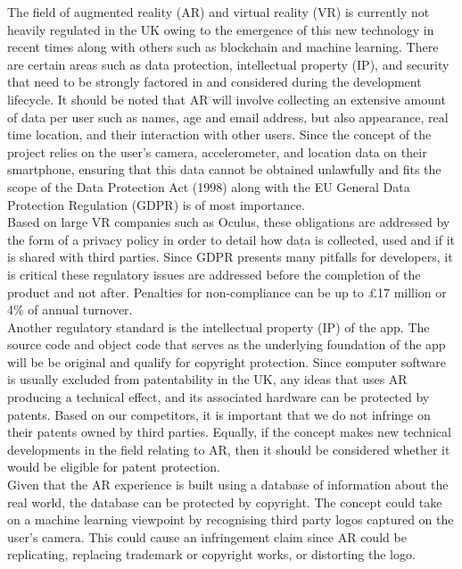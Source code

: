 The field of augmented reality (AR) and virtual reality (VR) is currently not heavily regulated in the UK owing to the emergence of this new technology in recent times along with others such as blockchain and machine learning. There are certain areas such as data protection, intellectual property (IP), and security that need to be strongly factored in and considered during the development lifecycle. It should be noted that AR will involve collecting an extensive amount of data per user such as names, age and email address, but also appearance, real time location, and their interaction with other users.  Since the concept of the project relies on the user's camera, accelerometer, and location data on their smartphone, ensuring that this data cannot be obtained unlawfully and fits the scope of the Data Protection Act (1998) along with the EU General Data Protection Regulation (GDPR) is of most importance.\cite{ITProPortal}\\

Based on large VR companies such as Oculus, these obligations are addressed by the form of a privacy policy in order to detail how data is collected, used and if it is shared with third parties. Since GDPR presents many pitfalls for developers, it is critical these regulatory issues are addressed before the completion of the product and not after. Penalties for non-compliance can be up to \pounds 17 million or 4\% of annual turnover. \cite{eversheds}\\

Another regulatory standard is the intellectual property (IP) of the app. The source code and object code that serves as the underlying foundation of the app will be be original and qualify for copyright protection. Since computer software is usually excluded from patentability in the UK, any ideas that uses AR producing a technical effect, and its associated hardware can be protected by patents. Based on our competitors, it is important that we do not infringe on their patents owned by third parties. Equally, if the concept makes new technical developments in the field relating to AR, then it should be considered whether it would be eligible for patent protection.\\

Given that the AR experience is built using a database of information about the real world, the database can be protected by copyright. The concept could take on a machine learning viewpoint by recognising third party logos captured on the user's camera. This could cause an infringement claim since AR could be replicating, replacing trademark or copyright works, or distorting the logo.\\
